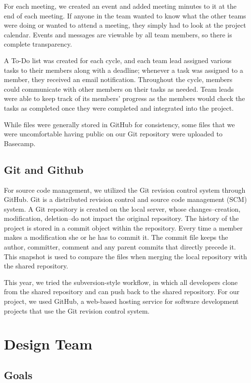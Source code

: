 \documentclass[12pt, letterpaper]{article}
\begin{document}
For each meeting, we created an event and added meeting minutes to it at the end of each meeting. If anyone in the team wanted to know what the other teams were doing or wanted to attend a meeting, they simply had to look at the project calendar. Events and messages are viewable by all team members, so there is complete transparency.

A To-Do list was created for each cycle, and each team lead assigned various tasks to their members along with a deadline; whenever a task was assigned to a member, they received an email notification.  Throughout the cycle, members could communicate with other members on their tasks as needed. Team leads were able to keep track of its members’ progress as the members would check the tasks as completed once they were completed and integrated into the project.

While files were generally stored in GitHub for consistency, some files that we were uncomfortable having public on our Git repository were uploaded to Basecamp.

\subsection{Git and Github}
For source code management, we utilized the Git revision control system through GitHub. Git is a distributed revision control and source code management (SCM) system. A Git repository is created on the local server, whose changes--creation, modification, deletion--do not impact the original repository.   The history of the project is stored in a commit object within the repository. Every time a member makes a modification she or he has to commit it. The commit file keeps the author, committer, comment and any parent commits that directly precede it. This snapshot is used to compare the files when merging the local repository with the shared repository.

This year, we tried the subversion-style workflow, in which all developers clone from the shared repository and can push back to the shared repository. For our project, we used GitHub, a web-based hosting service for software development projects that use the Git revision control system.

\section{Design Team}
\subsection{Goals}
\end{document}
